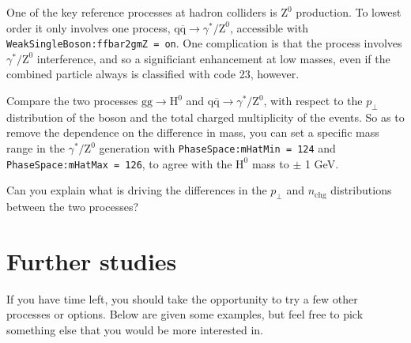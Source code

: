 \documentclass[12pt,a4paper]{article}
\newcommand{\mrm}[1]{\mathrm{#1}}
\newcommand{\pT}{p_{\perp}}
\newcommand{\g}{{\mathrm g}}
\newcommand{\q}{{\mathrm q}}
\renewcommand{\H}{{\mathrm H}}
\newcommand{\Z}{{\mathrm Z}}
\newcommand{\qbar}{\overline{\mathrm q}}
\begin{document}
One of the key reference processes at hadron colliders is $\Z^0$ production.
To lowest order it only involves one process, $\q\qbar \to \gamma^*/\Z^0$,
accessible with \texttt{WeakSingleBoson:ffbar2gmZ = on}. One complication
is that the process involves $\gamma^*/\Z^0$ interference, and so a 
significiant enhancement at low masses, even if the combined particle
always is classified with code 23, however. 

Compare the two processes $\g\g \to \H^0$ and $\q\qbar \to \gamma^*/\Z^0$,
with respect to the $\pT$ distribution of the boson and the total charged
multiplicity of the events. So as to remove the dependence on the difference
in mass, you can set a specific mass range in the $\gamma^*/\Z^0$ 
generation with \texttt{PhaseSpace:mHatMin = 124} and 
\texttt{PhaseSpace:mHatMax = 126}, to agree with the $\H^0$ mass
to $\pm$ 1 GeV.

Can you explain what is driving the differences in the $\pT$ and 
$n_{\mrm{chg}}$ distributions between the two processes? 

\section{Further studies}

If you have time left, you should take the opportunity to try 
a few other processes or options. Below are given some examples, 
but feel free to pick something else that you would be more
interested in.  
\end{document}
